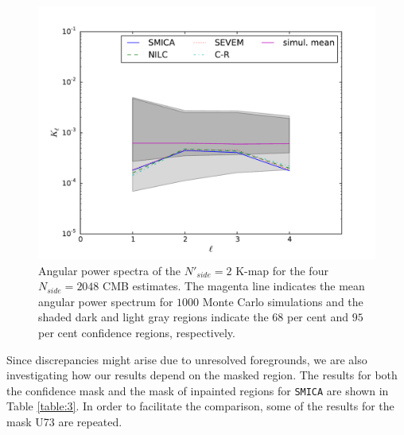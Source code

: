\begin{figure}
\centering
\includegraphics[width=\textwidth]{figures/chapter-vsk/Kl_u73.pdf}
\caption{Angular power spectra of the $N'_{side} = 2$ K-map for the four $N_{side} = 2048$ CMB estimates. The magenta line indicates the mean angular power spectrum for $1000$ Monte Carlo simulations and the shaded dark and light gray regions indicate the $68$ per cent and $95$ per cent confidence regions, respectively.}
\label{Fig:4b}
\end{figure}

Since discrepancies might arise due to unresolved foregrounds, we are also investigating how our results depend on the masked region. The results for both the confidence mask and the mask of inpainted regions for \texttt{SMICA} are shown in Table \ref{table:3}. In order to facilitate the comparison, some of the results for the mask U73 are repeated. %

